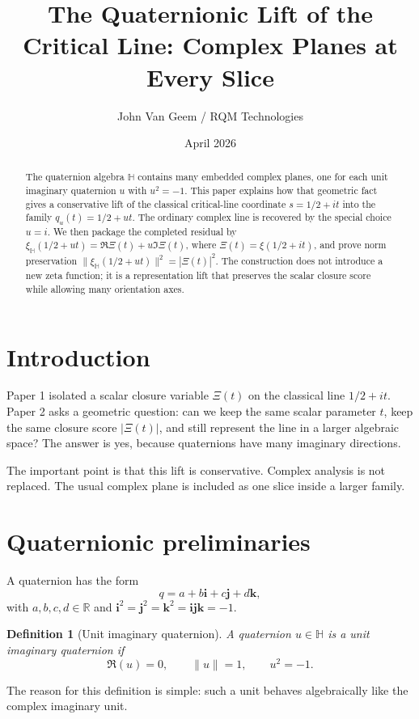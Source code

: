 \documentclass[11pt]{article}
\title{The Quaternionic Lift of the Critical Line: Complex Planes at Every Slice}
\author{John Van Geem / RQM Technologies}
\date{April 2026}
\newtheorem{definition}{Definition}
\begin{document}
\maketitle

\begin{abstract}
The quaternion algebra $\mathbb H$ contains many embedded complex planes, one for each unit imaginary quaternion $u$ with $u^2=-1$. This paper explains how that geometric fact gives a conservative lift of the classical critical-line coordinate $s=1/2+it$ into the family $q_u(t)=1/2+ut$. The ordinary complex line is recovered by the special choice $u=i$. We then package the completed residual by $\xi_{\mathbb H}(1/2+ut)=\Re\Xi(t)+u\Im\Xi(t)$, where $\Xi(t)=\xi(1/2+it)$, and prove norm preservation $\|\xi_{\mathbb H}(1/2+ut)\|^2=|\Xi(t)|^2$. The construction does not introduce a new zeta function; it is a representation lift that preserves the scalar closure score while allowing many orientation axes.
\end{abstract}

\section{Introduction}
Paper 1 isolated a scalar closure variable $\Xi(t)$ on the classical line $1/2+it$. Paper 2 asks a geometric question: can we keep the same scalar parameter $t$, keep the same closure score $|\Xi(t)|$, and still represent the line in a larger algebraic space? The answer is yes, because quaternions have many imaginary directions.

The important point is that this lift is conservative. Complex analysis is not replaced. The usual complex plane is included as one slice inside a larger family.

\section{Quaternionic preliminaries}
A quaternion has the form
\[
q=a+b\mathbf i+c\mathbf j+d\mathbf k,
\]
with $a,b,c,d\in\mathbb R$ and $\mathbf i^2=\mathbf j^2=\mathbf k^2=\mathbf i\mathbf j\mathbf k=-1$.

\begin{definition}[Unit imaginary quaternion]
A quaternion $u\in\mathbb H$ is a unit imaginary quaternion if
\[
\Re(u)=0,\qquad \|u\|=1,\qquad u^2=-1.
\]
\end{definition}
The reason for this definition is simple: such a unit behaves algebraically like the complex imaginary unit.
\end{document}
